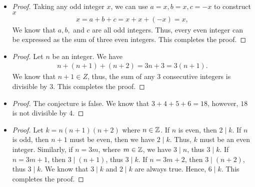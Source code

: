 \documentclass[8pt,twocolumn]{article}
\begin{document}
\begin{Answer}[number=2.2.2]
\begin{itemize}
    \item
      \begin{proof}
        Taking any odd integer $x$, we can use $a = x, b = x, c = -x$ to construct
        $x$
        \begin{align*}
          x = a + b + c = x + x + (-x) = x,
        \end{align*}
        We know that $a, b,$ and $c$ are all odd integers. Thus, every even
        integer can be expressed as the sum of three even integers. This
        completes the proof.
      \end{proof}
  \end{itemize}
\end{Answer}

\begin{Answer}[number=2.2.3]
  \begin{itemize}
    \item
      \begin{proof}
        Let $n$ be an integer. We have
        \begin{align*}
          n + (n+1) + (n+2) = 3n + 3 = 3(n+1).
        \end{align*}
        We know that $n+1\in Z$, thus, the sum of any $3$ consecutive integers
        is divisible by $3$. This completes the proof.
      \end{proof}
    \item
      \begin{proof}
        The conjecture is false. We know that $3+4+5+6 = 18$, however, $18$ is
        not divisible by $4$.
      \end{proof}
    \item
      \begin{proof}
        Let $k=n(n+1)(n+2)$ where $n\in \mathbb{Z}$. If $n$ is even, then $2\mid k$. If
        $n$ is odd, then $n+1$ must be even, then we have $2\mid k$. Thus, $k$
        must be an even integer. Similarly, if $n = 3m$, where $m\in \mathbb{Z}$, we
        have $3\mid n$, thus $3\mid k$. If $n = 3m+1$, then $3\mid (n+1)$, thus
        $3\mid k$. If $n = 3m+2$, then $3\mid (n+2)$, thus $3\mid k$. We know
        that $3\mid k$ and $2\mid k$ are always true. Hence, $6\mid k$. This
        completes the proof.
      \end{proof}
  \end{itemize}
\end{Answer}
\end{document}

